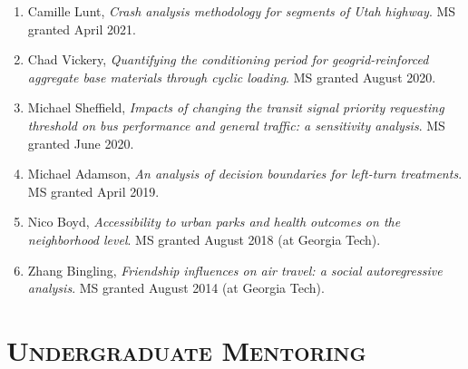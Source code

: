 \documentclass[margin,line]{res}
\newcounter{enuminitialize}
\newenvironment{myenum}[1][]
{%
 \setcounter{enuminitialize}{#1}
 \addtocounter{enuminitialize}{2}
 \begin{enumerate}[left= 4pt, itemsep=8pt, start=\value{enuminitialize}, label=\arabic*\addtocounter{enumi}{-2}]
}
{%
 \end{enumerate}
}
\newcommand{\secfont}{\scshape }
\begin{document}
\begin{resume}
\begin{myenum}[22]
  \item Camille Lunt, \textit{Crash analysis methodology for segments of Utah highway}. MS granted April 2021.
  \item Chad Vickery, \textit{Quantifying the conditioning period for geogrid-reinforced aggregate base materials through cyclic loading}. MS granted August 2020.
  \item Michael Sheffield, \textit{Impacts of changing the transit signal priority requesting threshold on bus performance and general traffic: a sensitivity analysis}. MS granted June 2020.
  \item Michael Adamson, \textit{An analysis of decision boundaries for left-turn treatments}. MS granted April 2019.
  \item Nico Boyd, \textit{Accessibility to urban parks and health outcomes on the neighborhood level}. MS granted August 2018 (at Georgia Tech).
  \item Zhang Bingling, \textit{Friendship influences on air travel: a social autoregressive analysis}. MS granted August 2014 (at Georgia Tech).
\end{myenum}


\noindent\makebox[\linewidth]{\rule{\linewidth}{0.4pt}}
\section{\secfont Undergraduate Mentoring}


\end{resume}
\end{document}
